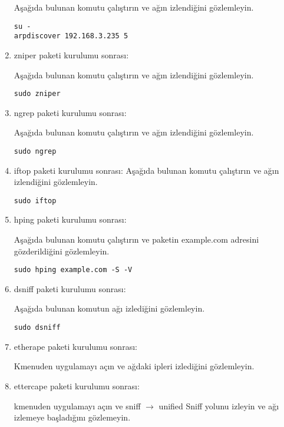 \documentclass[a4paper,10pt]{article}
\begin{document}
\begin{enumerate}
Aşağıda bulunan komutu çalıştırın ve ağın izlendiğini gözlemleyin.
\begin{verbatim}
su -
arpdiscover 192.168.3.235 5
\end{verbatim}

\item zniper paketi kurulumu sonrası:

Aşağıda bulunan komutu çalıştırın ve ağın izlendiğini gözlemleyin.
\begin{verbatim}
sudo zniper
\end{verbatim}

\item ngrep paketi kurulumu sonrası:

Aşağıda bulunan komutu çalıştırın ve ağın izlendiğini gözlemleyin.
\begin{verbatim}
sudo ngrep
\end{verbatim}


\item iftop paketi kurulumu sonrası:
Aşağıda bulunan komutu çalıştırın ve ağın izlendiğini gözlemleyin.
\begin{verbatim}
sudo iftop 
\end{verbatim}

 \item hping paketi kurulumu sonrası:

Aşağıda bulunan komutu çalıştırın ve paketin example.com adresini gözderildiğini gözlemleyin.
\begin{verbatim}
sudo hping example.com -S -V 
\end{verbatim}


 \item dsniff paketi kurulumu sonrası:

Aşağıda bulunan komutun ağı izlediğini gözlemleyin.
\begin{verbatim}
sudo dsniff
\end{verbatim}

\item etherape paketi kurulumu sonrası:

Kmenuden uygulamayı açın ve ağdaki ipleri izlediğini gözlemleyin.

\item ettercape paketi kurulumu sonrası:

kmenuden uygulamayı açın ve sniff $\rightarrow$ unified Sniff yolunu izleyin ve ağı izlemeye başladığını gözlemeyin.
\end{enumerate}
\end{document}
